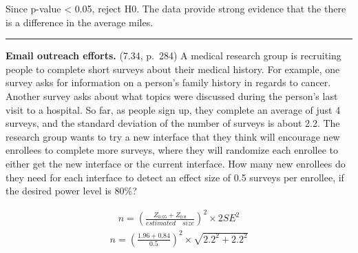 \documentclass[]{article}
\newenvironment{Shaded}{\begin{snugshade}}{\end{snugshade}}
\newcommand{\CommentTok}[1]{\textcolor[rgb]{0.56,0.35,0.01}{\textit{#1}}}
\newcommand{\DataTypeTok}[1]{\textcolor[rgb]{0.13,0.29,0.53}{#1}}
\newcommand{\DecValTok}[1]{\textcolor[rgb]{0.00,0.00,0.81}{#1}}
\newcommand{\FloatTok}[1]{\textcolor[rgb]{0.00,0.00,0.81}{#1}}
\newcommand{\KeywordTok}[1]{\textcolor[rgb]{0.13,0.29,0.53}{\textbf{#1}}}
\newcommand{\NormalTok}[1]{#1}
\newcommand{\OperatorTok}[1]{\textcolor[rgb]{0.81,0.36,0.00}{\textbf{#1}}}
\newcommand{\StringTok}[1]{\textcolor[rgb]{0.31,0.60,0.02}{#1}}
\begin{document}
Since p-value \textless{} 0.05, reject H0. The data provide strong
evidence that the there is a difference in the average miles.

\begin{center}\rule{0.5\linewidth}{\linethickness}\end{center}

\clearpage

\textbf{Email outreach efforts.} (7.34, p.~284) A medical research group
is recruiting people to complete short surveys about their medical
history. For example, one survey asks for information on a person's
family history in regards to cancer. Another survey asks about what
topics were discussed during the person's last visit to a hospital. So
far, as people sign up, they complete an average of just 4 surveys, and
the standard deviation of the number of surveys is about 2.2. The
research group wants to try a new interface that they think will
encourage new enrollees to complete more surveys, where they will
randomize each enrollee to either get the new interface or the current
interface. How many new enrollees do they need for each interface to
detect an effect size of 0.5 surveys per enrollee, if the desired power
level is 80\%?

\[
\begin{aligned}
n=\left( \frac { { Z }_{ 0.05 }+{ Z }_{ 0.8 } }{ estimated\quad size }  \right) ^{ 2 }\times 2SE^{ 2 }
\end{aligned}
\] \[
\begin{aligned}
n=\left( \frac { 1.96+0.84 }{ 0.5 }  \right) ^{ 2 }\times \sqrt { { 2.2 }^{ 2 }+{ 2.2 }^{ 2 } } 
\end{aligned}
\]

\begin{Shaded}
\end{Shaded}
\end{document}
